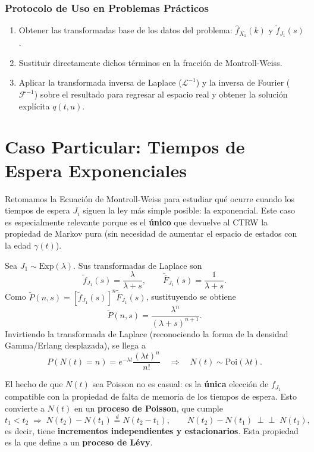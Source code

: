 \subsubsection{Protocolo de Uso en Problemas Prácticos}
\begin{enumerate}
    \item[\textbf{Paso 1:}] Obtener las transformadas base de los datos del problema: $\hat{f}_{X_1}(k)$ y $\widetilde{f}_{J_1}(s)$.
    \item[\textbf{Paso 2:}] Sustituir directamente dichos términos en la fracción de Montroll-Weiss.
    \item[\textbf{Paso 3:}] Aplicar la transformada inversa de Laplace ($\mathcal{L}^{-1}$) y la inversa de Fourier ($\mathcal{F}^{-1}$) sobre el resultado para regresar al espacio real y obtener la solución explícita $q(t, u)$.
\end{enumerate}

\section{Caso Particular: Tiempos de Espera Exponenciales}

\noindent
Retomamos la Ecuación de Montroll-Weiss para estudiar qué ocurre cuando los tiempos de espera $J_i$ siguen la ley más simple posible: la exponencial. Este caso es especialmente relevante porque es el \textbf{único} que devuelve al CTRW la propiedad de Markov pura (sin necesidad de aumentar el espacio de estados con la edad $\gamma(t)$).

\begin{ejemplo}
    Sea $J_1 \sim \text{Exp}(\lambda)$. Sus transformadas de Laplace son
    \[
    \widetilde{f}_{J_1}(s) = \frac{\lambda}{\lambda+s}, \qquad \widetilde{\overline{F}}_{J_1}(s) = \frac{1}{\lambda+s}.
    \]
    Como $\widetilde{P}(n,s) = \left[\widetilde{f}_{J_1}(s)\right]^n \widetilde{\overline{F}}_{J_1}(s)$, sustituyendo se obtiene
    \[
    \widetilde{P}(n,s) = \frac{\lambda^n}{(\lambda+s)^{n+1}}.
    \]
    Invirtiendo la transformada de Laplace (reconociendo la forma de la densidad Gamma/Erlang desplazada), se llega a
    \[
    \boxed{P(N(t)=n) = e^{-\lambda t}\frac{(\lambda t)^n}{n!}} \quad \Longrightarrow \quad N(t) \sim \text{Poi}(\lambda t).
    \]
\end{ejemplo}

\begin{observacion}
El hecho de que $N(t)$ sea Poisson no es casual: es la \textbf{única} elección de $f_{J_1}$ compatible con la propiedad de falta de memoria de los tiempos de espera. Esto convierte a $N(t)$ en un \textbf{proceso de Poisson}, que cumple
\[
t_1 < t_2 \;\Longrightarrow\; N(t_2)-N(t_1) \overset{d}{=} N(t_2-t_1), \qquad N(t_2)-N(t_1) \;\perp\!\!\!\perp\; N(t_1),
\]
es decir, tiene \textbf{incrementos independientes y estacionarios}. Esta propiedad es la que define a un \textbf{proceso de Lévy}.
\end{observacion}


